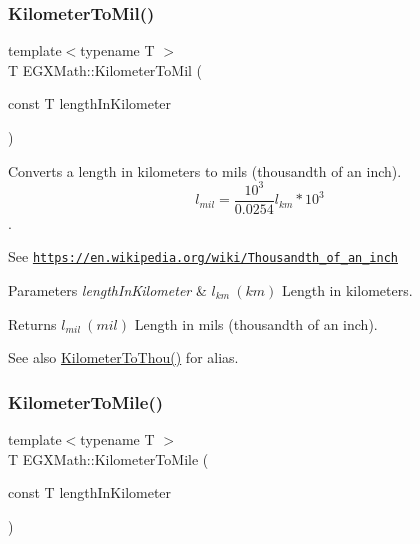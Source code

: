 \subsubsection{\texorpdfstring{Kilometer\+To\+Mil()}{KilometerToMil()}}
{\footnotesize\ttfamily template$<$typename T $>$ \\
T E\+G\+X\+Math\+::\+Kilometer\+To\+Mil (\begin{DoxyParamCaption}\item[{const T}]{length\+In\+Kilometer }\end{DoxyParamCaption})}



Converts a length in kilometers to mils (thousandth of an inch). \[ l_{mil}= \frac{10^{3}}{0.0254} l_{km} * 10^{3} \]. 

See \href{https://en.wikipedia.org/wiki/Thousandth_of_an_inch}{\tt https\+://en.\+wikipedia.\+org/wiki/\+Thousandth\+\_\+of\+\_\+an\+\_\+inch} 
\begin{DoxyParams}{Parameters}
{\em length\+In\+Kilometer} & $ l_{km}\ (km)$ Length in kilometers. \\
\hline
\end{DoxyParams}
\begin{DoxyReturn}{Returns}
$ l_{mil}\ (mil)$ Length in mils (thousandth of an inch). 
\end{DoxyReturn}
\begin{DoxySeeAlso}{See also}
\mbox{\hyperlink{group___e_g_x_math-_conversions-_length_conversions-_kilometer-_imperial_gabcd7d2e467bc0e80c61257ba641d0f48}{Kilometer\+To\+Thou()}} for alias. 
\end{DoxySeeAlso}
\mbox{\label{group___e_g_x_math-_conversions-_length_conversions-_kilometer-_imperial_ga781cd502fe13eb76e4e6b8e1fa7d55ed}} 
\subsubsection{\texorpdfstring{Kilometer\+To\+Mile()}{KilometerToMile()}}
{\footnotesize\ttfamily template$<$typename T $>$ \\
T E\+G\+X\+Math\+::\+Kilometer\+To\+Mile (\begin{DoxyParamCaption}\item[{const T}]{length\+In\+Kilometer }\end{DoxyParamCaption})}



